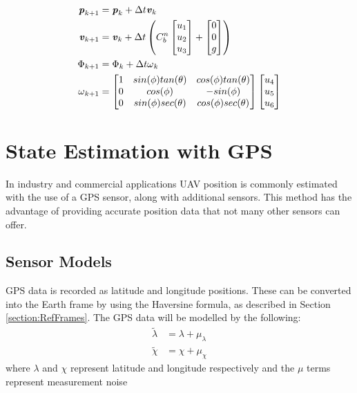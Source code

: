 \begin{equation}\label{eqn:OFS_EKFStateTrans}
\begin{split}
\textbf{\textit{p}}_{k+1}&=\textbf{\textit{p}}_{k}+\Delta t\textbf{\textit{v}}_{k} \\
\textbf{\textit{v}}_{k+1}&=\textbf{\textit{v}}_{k}+\Delta t\left( C^{n}_{b}
\begin{bmatrix}
u_{1}\\
u_{2}\\
u_{3}
\end{bmatrix}
+
\begin{bmatrix}
0\\
0\\
g
\end{bmatrix}
\right)\\
\textbf{\textit{$\Phi$}}_{k+1}&=\textbf{\textit{$\Phi$}}_{k}+\Delta t\textbf{\textit{$\omega$}}_{k}\\
\textbf{\textit{$\omega$}}_{k+1}&=
\begin{bmatrix}
1& sin(\phi)tan(\theta)& cos(\phi)tan(\theta)\\
0 &cos(\phi) &-sin(\phi)\\
0 &sin(\phi)sec(\theta) &cos(\phi)sec(\theta)
\end{bmatrix}
\begin{bmatrix}
u_{4}\\
u_{5}\\
u_{6}
\end{bmatrix}
\end{split}
\end{equation}
 

\section{State Estimation with GPS}
In industry and commercial applications UAV position is commonly estimated with the use of a GPS sensor, along with additional sensors. This method has the advantage of providing accurate position data that not many other sensors can offer.

\subsection{Sensor Models}\label{section:GPS_sensorModels}
GPS data is recorded as latitude and longitude positions. These can be converted into the Earth frame by using the Haversine formula, as described in Section \ref{section:RefFrames}. The GPS data will be modelled by the following:
\begin{equation}
\begin{split}
\tilde{\lambda}&=\lambda+\mu_{\lambda}\\
\tilde{\chi}&=\chi +\mu_{\chi}
\end{split}
\end{equation}
where $\lambda$ and $\chi$ represent latitude and longitude respectively and the $\mu$ terms represent measurement noise

